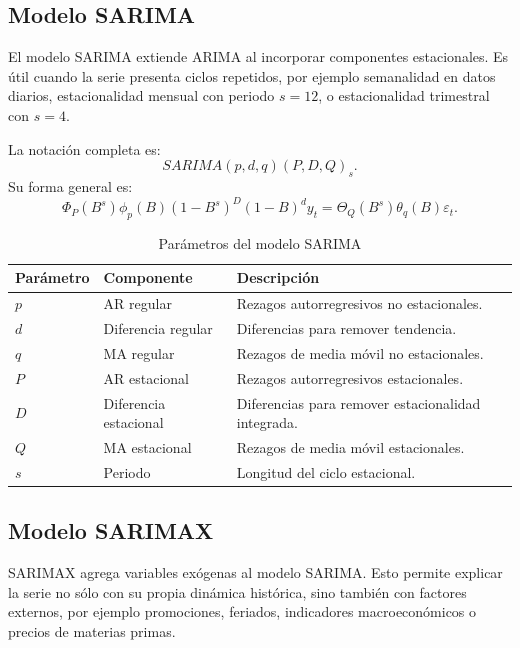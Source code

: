 \documentclass[11pt,letterpaper]{article}
\begin{document}
\subsection{Modelo SARIMA}

\begin{markdowncell}
El modelo SARIMA extiende ARIMA al incorporar componentes estacionales. Es útil cuando la serie presenta ciclos repetidos, por ejemplo semanalidad en datos diarios, estacionalidad mensual con periodo \(s=12\), o estacionalidad trimestral con \(s=4\).
\end{markdowncell}

\begin{latexcell}
La notación completa es:
\[
SARIMA(p,d,q)(P,D,Q)_s.
\]
Su forma general es:
\[
\Phi_P(B^s)\phi_p(B)(1-B^s)^D(1-B)^d y_t
= \Theta_Q(B^s)\theta_q(B)\varepsilon_t.
\]
\end{latexcell}

\begin{table}[H]
\centering
\caption{Parámetros del modelo SARIMA}
\label{tab:sarima}
\begin{tabular}{lll}
\toprule
\textbf{Parámetro} & \textbf{Componente} & \textbf{Descripción} \\
\midrule
\(p\) & AR regular & Rezagos autorregresivos no estacionales. \\
\(d\) & Diferencia regular & Diferencias para remover tendencia. \\
\(q\) & MA regular & Rezagos de media móvil no estacionales. \\
\(P\) & AR estacional & Rezagos autorregresivos estacionales. \\
\(D\) & Diferencia estacional & Diferencias para remover estacionalidad integrada. \\
\(Q\) & MA estacional & Rezagos de media móvil estacionales. \\
\(s\) & Periodo & Longitud del ciclo estacional. \\
\bottomrule
\end{tabular}
\end{table}

\subsection{Modelo SARIMAX}

\begin{markdowncell}
SARIMAX agrega variables exógenas al modelo SARIMA. Esto permite explicar la serie no sólo con su propia dinámica histórica, sino también con factores externos, por ejemplo promociones, feriados, indicadores macroeconómicos o precios de materias primas.
\end{markdowncell}
\end{document}
